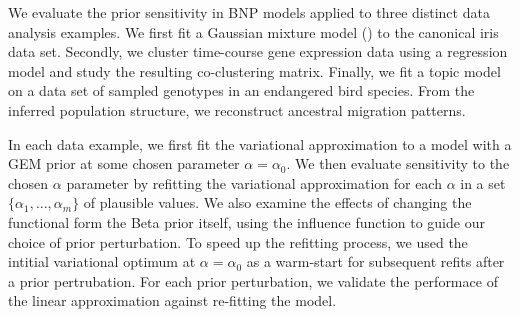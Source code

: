 We evaluate the prior sensitivity in BNP models applied to three distinct data analysis examples.
We first fit a Gaussian mixture model () to the canonical iris data set.
Secondly, we cluster time-course gene expression data using a regression model
and study the resulting co-clustering matrix.
Finally, we fit a topic model
on a data set of sampled genotypes in an endangered bird species.
From the inferred population structure,
we reconstruct ancestral migration patterns.

In each data example, we first fit the variational approximation to a model
with a GEM prior at some chosen parameter $\alpha = \alpha_0$.
We then evaluate sensitivity to the chosen $\alpha$ parameter
by refitting the variational approximation for each $\alpha$
in a set $\{\alpha_1, ..., \alpha_m\}$ of plausible values.
We also examine the effects of changing the functional form the Beta prior itself,
using the influence function to guide our choice of prior perturbation.
To speed up the refitting process, we used the intitial
variational optimum at $\alpha = \alpha_0$ as a warm-start
for subsequent refits after a prior pertrubation.
For each prior perturbation,
we validate the performace of the linear approximation against
re-fitting the model.
